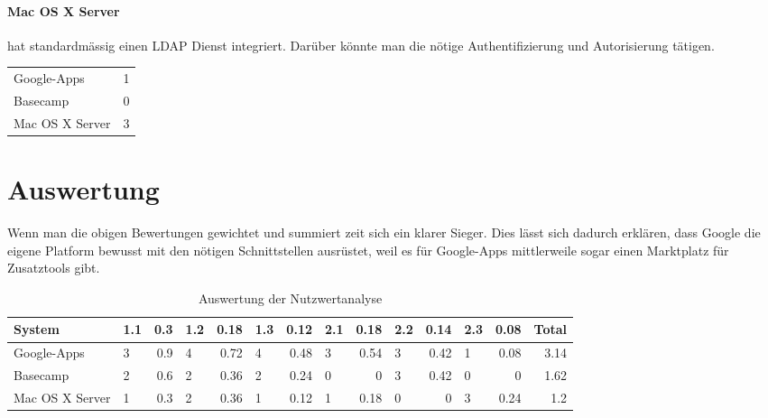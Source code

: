 \paragraph{Mac OS X Server}
\label{par:2.3Mac OS X Server}
hat standardmässig einen LDAP Dienst integriert. Darüber könnte man die nötige Authentifizierung und Autorisierung tätigen.

\begin{tabular}{lc}
Google-Apps & 1\\
Basecamp & 0\\
Mac OS X Server & 3\\
\end{tabular}

\section{Auswertung}
\label{sec:Auswertung}
Wenn man die obigen Bewertungen gewichtet und summiert zeit sich ein klarer Sieger. Dies lässt sich dadurch erklären, dass Google die eigene Platform bewusst mit den nötigen Schnittstellen ausrüstet, weil es für Google-Apps mittlerweile sogar einen Marktplatz für Zusatztools gibt.

\begin{table}[h!]
  \centering
  \begin{tabular}{|l|lr|lr|lr|lr|lr|lr|r|}
  \hline
  System & 1.1 & 0.3 & 1.2 & 0.18 & 1.3 & 0.12 & 2.1 & 0.18 & 2.2 & 0.14 & 2.3 & 0.08 & Total\\
  \hline
  Google-Apps & 3 & 0.9 & 4 & 0.72 & 4 & 0.48 & 3 & 0.54 & 3 & 0.42 & 1 & 0.08 & 3.14\\
  \hline
  Basecamp & 2 & 0.6 & 2 & 0.36 & 2 & 0.24 & 0 & 0 & 3 & 0.42 & 0 & 0 & 1.62\\
  \hline
  Mac OS X Server & 1 & 0.3 & 2 & 0.36 & 1 & 0.12 & 1 & 0.18 & 0 & 0 & 3 & 0.24 & 1.2\\
  \hline
  \end{tabular}
  \label{tab:auswertung_nutzwertanalyse}
  \caption{Auswertung der Nutzwertanalyse}
\end{table}